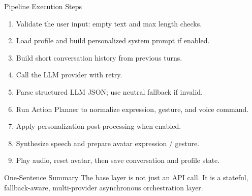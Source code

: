 \documentclass[aspectratio=169]{beamer}
\begin{document}
\begin{frame}{Pipeline Execution Steps}
  \small
  \begin{enumerate}
    \item Validate the user input: empty text and max length checks.
    \item Load profile and build personalized system prompt if enabled.
    \item Build short conversation history from previous turns.
    \item Call the LLM provider with retry.
    \item Parse structured LLM JSON; use neutral fallback if invalid.
    \item Run Action Planner to normalize expression, gesture, and voice command.
    \item Apply personalization post-processing when enabled.
    \item Synthesize speech and prepare avatar expression / gesture.
    \item Play audio, reset avatar, then save conversation and profile state.
  \end{enumerate}
  \vspace{0.2cm}
  \begin{block}{One-Sentence Summary}
    The base layer is not just an API call. It is a stateful, fallback-aware, multi-provider asynchronous orchestration layer.
  \end{block}
\end{frame}
\end{document}
